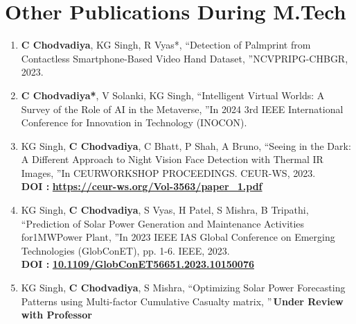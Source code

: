 \section*{\textcolor{internationalkleinblue}{\textbf{Other Publications During M.Tech}}}
\begin{enumerate}
   	\item \textbf{C Chodvadiya}, KG Singh, R Vyas*, \textquotedblleft Detection of Palmprint from Contactless Smartphone-Based Video Hand Dataset, \textquotedblright  NCVPRIPG-CHBGR, 2023.

    \item \textbf{C Chodvadiya*}, V Solanki, KG Singh, \textquotedblleft Intelligent Virtual Worlds: A Survey of the Role of AI in the Metaverse, \textquotedblright  In 2024 3rd IEEE International Conference for Innovation in Technology (INOCON).

    \item KG Singh, \textbf{C Chodvadiya}, C Bhatt, P Shah, A Bruno, \textquotedblleft Seeing in the Dark: A Different Approach to Night Vision Face Detection with Thermal IR Images, \textquotedblright  In CEURWORKSHOP PROCEEDINGS. CEUR-WS, 2023.\\ \textbf{DOI : }\textcolor{internationalkleinblue}{\textbf{\url{https://ceur-ws.org/Vol-3563/paper_1.pdf}}}

    \item KG Singh, \textbf{C Chodvadiya}, S Vyas, H Patel, S Mishra, B Tripathi, \textquotedblleft Prediction of Solar Power Generation and Maintenance Activities for1MWPower Plant, \textquotedblright In 2023 IEEE IAS Global Conference on Emerging Technologies (GlobConET), pp. 1-6. IEEE, 2023. \\ \textbf{DOI : }\textcolor{internationalkleinblue}{\textbf{\url{10.1109/GlobConET56651.2023.10150076}}}

    \item KG Singh, \textbf{C Chodvadiya}, S Mishra, \textquotedblleft Optimizing Solar Power Forecasting Patterns using Multi-factor Cumulative Casualty matrix, \textquotedblright \,\textcolor{internationalkleinblue}{\textbf{Under Review with Professor}}
    
	

\end{enumerate}


